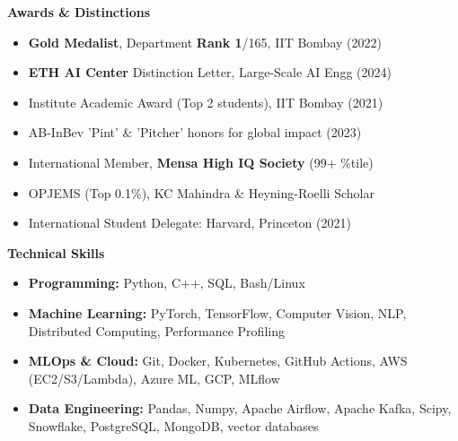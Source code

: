 \documentclass[letterpaper,10pt]{article}
\begin{document}
\titlerule
\vspace{4pt}
{\small
\begin{multicols}{2}

{\vspace{-4pt}\scshape\raggedright\large\bfseries Awards \& Distinctions}
\begin{itemize}[leftmargin=0.15in, itemsep=-2pt]
  \item \textbf{Gold Medalist}, Department \textbf{Rank 1}/165, IIT Bombay (2022)
  \item \textbf{ETH AI Center} Distinction Letter, Large-Scale AI Engg (2024)
  \item Institute Academic Award (Top 2 students), IIT Bombay (2021)
  \item AB-InBev 'Pint' \& 'Pitcher' honors for global impact (2023)
  \item International Member, \textbf{Mensa High IQ Society} (99+ \%tile)
  \item OPJEMS (Top 0.1\%), KC Mahindra \& Heyning-Roelli Scholar
  \item International Student Delegate: Harvard, Princeton (2021)
\end{itemize}

\columnbreak

{\vspace{-4pt} \scshape\raggedright\large\bfseries Technical Skills}
\begin{itemize}[leftmargin=0.15in]
  \item \textbf{Programming:} Python, C++, SQL, Bash/Linux 
  \item \textbf{Machine Learning:} PyTorch, TensorFlow, Computer Vision, NLP, Distributed Computing, Performance Profiling
  \item \textbf{MLOps \& Cloud:} Git, Docker, Kubernetes, GitHub Actions, AWS (EC2/S3/Lambda), Azure ML, GCP, MLflow
  \item \textbf{Data Engineering:} Pandas, Numpy, Apache Airflow, Apache Kafka, Scipy, Snowflake, PostgreSQL, MongoDB, vector databases
\end{itemize}
\end{multicols}
}

\end{document}
